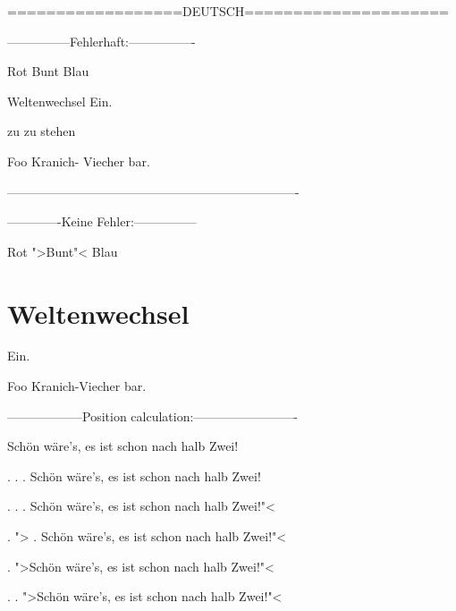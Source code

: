 
==================DEUTSCH=====================

---------------Fehlerhaft:----------------



Rot Bunt Blau


Weltenwechsel Ein.


zu zu stehen


Foo Kranich- Viecher bar. 

----------------------------------------------------------------------

-------------Keine Fehler:---------------



Rot ">Bunt"< Blau



\chapter{Weltenwechsel}
Ein.





Foo Kranich-Viecher bar. 





------------------Position calculation:-------------------------

Schön wäre's, es ist schon nach halb Zwei!

. . . Schön wäre's, es ist schon nach halb Zwei! 

. . . Schön wäre's, es ist schon nach halb Zwei!"<

. "> . Schön wäre's, es ist schon nach halb Zwei!"<

. ">Schön wäre's, es ist schon nach halb Zwei!"< 

. . ">Schön wäre's, es ist schon nach halb Zwei!"< 

